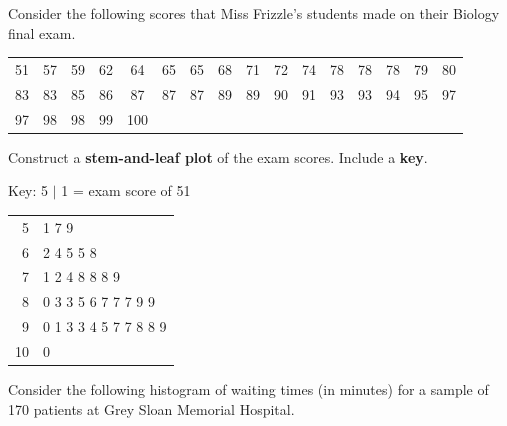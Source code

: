 \documentclass[noanswers]{exam}
\begin{document}
\begin{questions}
\vspace{3mm}

\newpage

\question Consider the following scores that Miss Frizzle's students made on their Biology final exam.
	
	\begin{center}
    \begin{tabular}{c c c c c c c c c c c c c c c c}
        51 & 57 & 59 & 62 & 64 & 65 & 65 & 68 & 71 & 72 & 74 & 78 & 78 & 78 & 79 & 80\\   
        83 & 83 & 85 & 86 & 87 & 87 & 87 & 89 & 89 & 90 & 91 & 93 & 93 & 94 & 95 & 97\\  
        97 & 98 & 98 & 99 & 100\\
    \end{tabular}
\end{center}

\vspace{1mm}

Construct a \textbf{stem-and-leaf plot} of the exam scores. Include a \textbf{key}.

\begin{solution}[\stretch{5}]
	
			Key: 5 $|$ 1 = exam score of 51		
		
			\vspace{3mm}
		
			\begin{tabular}{r|l}
			5 & 1 7 9 \\
			6 & 2 4 5 5 8\\ 
			7 & 1 2 4 8 8 8 9\\
			8 & 0 3 3 5 6 7 7 7 9 9\\
			9 & 0 1 3 3 4 5 7 7 8 8 9\\
			10 & 0			
			\end{tabular}

			\vspace{2mm}		
			
		\end{solution}
		
\question Consider the following histogram of waiting times (in minutes) for a sample of 170 patients at Grey Sloan Memorial Hospital.


\end{questions}
\end{document}
